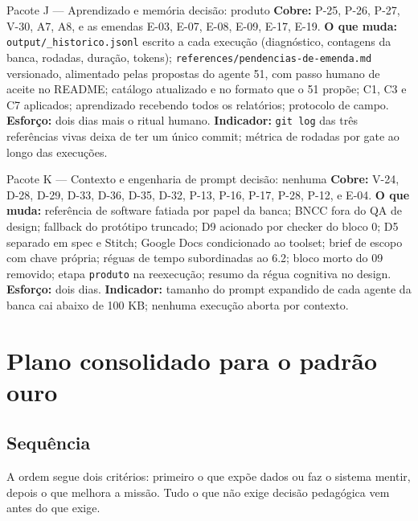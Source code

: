 \documentclass[11pt,a4paper]{article}
\begin{document}
\begin{achadobox}{Pacote J --- Aprendizado e memória \hfill decisão: produto}
\textbf{Cobre:} P-25, P-26, P-27, V-30, A7, A8, e as emendas E-03, E-07, E-08, E-09, E-17, E-19.
\textbf{O que muda:} \texttt{output/\_historico.jsonl} escrito a cada execução (diagnóstico,
contagens da banca, rodadas, duração, tokens); \texttt{references/pendencias-de-emenda.md}
versionado, alimentado pelas propostas do agente 51, com passo humano de aceite no README; catálogo
atualizado e no formato que o 51 propõe; C1, C3 e C7 aplicados; aprendizado recebendo todos os
relatórios; protocolo de campo.
\textbf{Esforço:} dois dias mais o ritual humano.
\textbf{Indicador:} \texttt{git log} das três referências vivas deixa de ter um único commit;
métrica de rodadas por gate ao longo das execuções.
\end{achadobox}

\begin{achadobox}{Pacote K --- Contexto e engenharia de prompt \hfill decisão: nenhuma}
\textbf{Cobre:} V-24, D-28, D-29, D-33, D-36, D-35, D-32, P-13, P-16, P-17, P-28, P-12, e E-04.
\textbf{O que muda:} referência de software fatiada por papel da banca; BNCC fora do QA de design;
fallback do protótipo truncado; D9 acionado por checker do bloco 0; D5 separado em spec e Stitch;
Google Docs condicionado ao toolset; brief de escopo com chave própria; réguas de tempo
subordinadas ao 6.2; bloco morto do 09 removido; etapa \texttt{produto} na reexecução; resumo da
régua cognitiva no design.
\textbf{Esforço:} dois dias.
\textbf{Indicador:} tamanho do prompt expandido de cada agente da banca cai abaixo de 100 KB;
nenhuma execução aborta por contexto.
\end{achadobox}

\section{Plano consolidado para o padrão ouro}

\subsection{Sequência}

A ordem segue dois critérios: primeiro o que expõe dados ou faz o sistema mentir, depois o que
melhora a missão. Tudo o que não exige decisão pedagógica vem antes do que exige.
\end{document}
